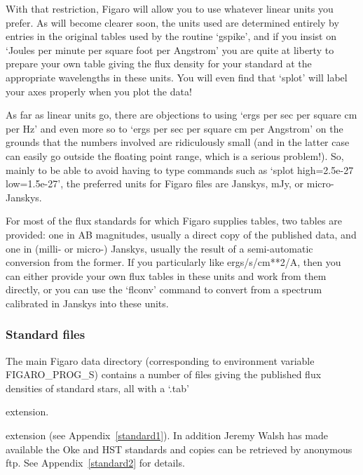 \documentclass[11pt,twoside]{article}
\newenvironment{latexonly}{}{}
\newcommand{\htmlref}[2]{#1}
\begin{document}
   With that restriction, Figaro will allow you to use whatever linear
   units you prefer.  As will become clearer soon, the units used are
   determined entirely by entries in the original tables used by the
   routine `gspike', and if you insist on `Joules per minute per square
   foot per Angstrom' you are quite at liberty to prepare your own table
   giving the flux density for your standard at the appropriate
   wavelengths in these units.  You will even find that `splot' will
   label your axes properly when you plot the data!


   As far as linear units go, there are objections to using `ergs per
   sec per square cm per Hz' and even more so to `ergs per sec per
   square cm per Angstrom' on the grounds that the numbers involved are
   ridiculously small (and in the latter case can easily go outside the
   floating point range, which is a serious problem!).  So, mainly to be
   able to avoid having to type commands such as `splot high=2.5e-27
   low=1.5e-27', the preferred units for Figaro files are Janskys, mJy,
   or micro-Janskys.


   For most of the flux standards for which Figaro supplies tables, two
   tables are provided: one in AB magnitudes, usually a direct copy of
   the published data, and one in (milli- or micro-) Janskys, usually
   the result of a semi-automatic conversion from the former.  If you
   particularly like ergs/s/cm**2/A, then you can either provide your
   own flux tables in these units and work from them directly, or you
   can use the `flconv' command to convert from a spectrum calibrated in
   Janskys into these units.


\subsubsection{\label{techno5standard}Standard files}

   The main Figaro data directory (corresponding to environment variable
   FIGARO\_PROG\_S) contains a number of files giving the
\htmlref{published flux densities}{standard1}
   of standard stars, all with a `.tab'
\begin{htmlonly}
   extension.
\end{htmlonly}
\begin{latexonly}
   extension (see Appendix~\ref{standard1}).
\end{latexonly}
   In addition  Jeremy Walsh has made available the
\htmlref{Oke and HST standards}{standard2} and copies can be
   retrieved by anonymous ftp.
\begin{latexonly}
See Appendix~\ref{standard2} for details.
\end{latexonly}
\end{document}
